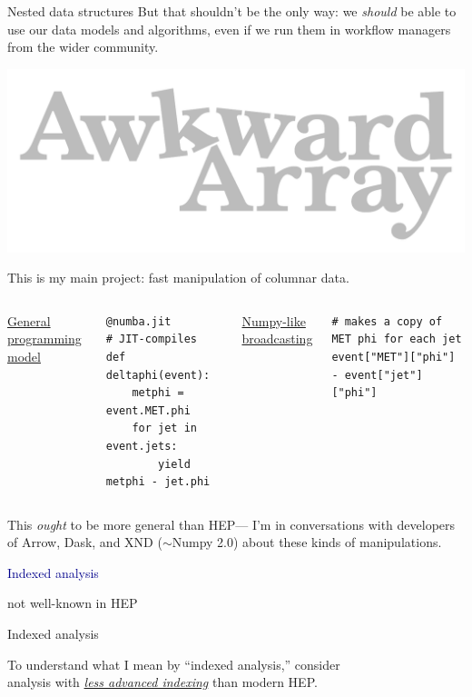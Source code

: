 \documentclass[aspectratio=169]{beamer}
\begin{document}
\begin{frame}[fragile]{Nested data structures}
\Large
\vspace{0.5 cm}
But that shouldn't be the only way: we {\it should} be able to use our data models and algorithms, even if we run them in workflow managers from the wider community.

\large
\vspace{0.5 cm}
\hfill \includegraphics[height=1 cm]{awkward-logo.pdf}

\vspace{-1 cm}
This is my main project: fast manipulation of columnar data.

\vspace{0.25 cm}
\scriptsize
\begin{columns}[t]
\underline{\large General programming model}

\begin{verbatim}
@numba.jit            # JIT-compiles
def deltaphi(event):
    metphi = event.MET.phi
    for jet in event.jets:
        yield metphi - jet.phi
\end{verbatim}

\underline{\large Numpy-like broadcasting}

\begin{verbatim}
# makes a copy of MET phi for each jet
event["MET"]["phi"] - event["jet"]["phi"]
\end{verbatim}
\end{columns}

\large
\vspace{0.5 cm}
This {\it ought} to be more general than HEP--- I'm in conversations with developers of Arrow, Dask, and XND ($\sim$Numpy 2.0) about these kinds of manipulations.
\end{frame}

\begin{frame}{}
\huge
\vspace{0.5 cm}
\begin{center}
\textcolor{darkblue}{Indexed analysis}

\large
\vspace{0.5 cm}
not well-known in HEP
\end{center}
\end{frame}

\begin{frame}{Indexed analysis}
\Large
\vspace{0.5 cm}
\begin{center}
To understand what I mean by ``indexed analysis,'' consider \\
analysis with \underline{\it less advanced indexing} than modern HEP.
\end{center}
\end{frame}
\end{document}
